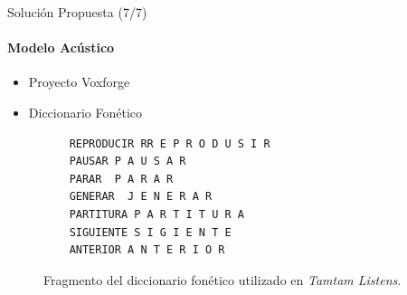 \begin{frame}[fragile]{Soluci\'on Propuesta (7/7)}
\framesubtitle{Modelo Acústico}
\begin{itemize}
    \item Proyecto Voxforge
    \item Diccionario Fonético    
\end{itemize}

    \begin{figure}[H]
    \begin{lstlisting}
    REPRODUCIR RR E P R O D U S I R
    PAUSAR P A U S A R
    PARAR  P A R A R
    GENERAR  J E N E R A R
    PARTITURA P A R T I T U R A
    SIGUIENTE S I G I E N T E
    ANTERIOR A N T E R I O R
    \end{lstlisting}
    \caption{Fragmento del diccionario fon\'etico utilizado en \emph{Tamtam Listens}.}
    \label{figure:fragmento-dic}
\end{figure}

\end{frame}

